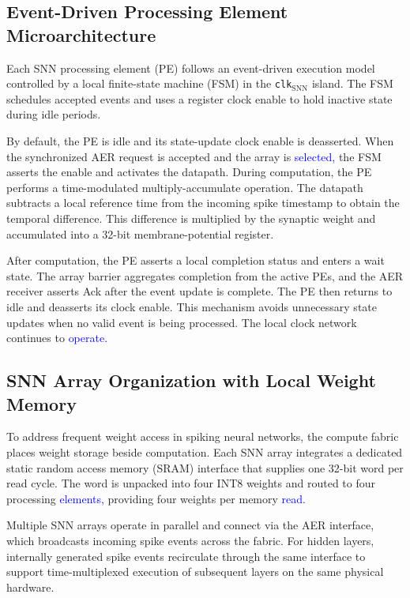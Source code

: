 \documentclass[12pt]{article}
\newcommand{\rev}[1]{\textcolor{blue}{#1}}
\begin{document}
\subsection{Event-Driven Processing Element Microarchitecture}
Each SNN processing element (PE) follows an event-driven execution model controlled by a local finite-state machine (FSM) in the \texttt{clk}$_{\mathrm{SNN}}$ island. The FSM schedules accepted events and uses a register clock enable to hold inactive state during idle periods.

By default, the PE is idle and its state-update clock enable is deasserted. When the synchronized AER request is accepted and the array is \rev{selected,} the FSM asserts the enable and activates the datapath. During computation, the PE performs a time-modulated multiply-accumulate operation. The datapath subtracts a local reference time from the incoming spike timestamp to obtain the temporal difference. This difference is multiplied by the synaptic weight and accumulated into a 32-bit membrane-potential register.

After computation, the PE asserts a local completion status and enters a wait state. The array barrier aggregates completion from the active PEs, and the AER receiver asserts Ack after the event update is complete. The PE then returns to idle and deasserts its clock enable. This mechanism avoids unnecessary state updates when no valid event is being processed. The local clock network continues to \rev{operate.}


\subsection{SNN Array Organization with Local Weight Memory}

To address frequent weight access in spiking neural networks, the compute fabric places weight storage beside computation. Each SNN array integrates a dedicated static random access memory (SRAM) interface that supplies one 32-bit word per read cycle. The word is unpacked into four INT8 weights and routed to four processing \rev{elements,} providing four weights per memory \rev{read.}

Multiple SNN arrays operate in parallel and connect via the AER interface, which broadcasts incoming spike events across the fabric. For hidden layers, internally generated spike events recirculate through the same interface to support time-multiplexed execution of subsequent layers on the same physical hardware.
\end{document}
